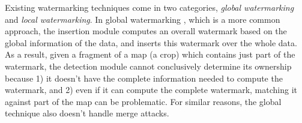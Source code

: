 

Existing watermarking techniques come in two categories, 
{\em global watermarking} and {\em local watermarking}. 
In global watermarking
\cite{KhannaZ00, SionAP02, SionAP03, Kitamura01:DFT, Liyuanyuan03},
which is a more common approach,
the insertion module computes an overall watermark based on 
the global information of the data, 
and inserts this watermark over the whole data. As a result,
given a fragment of a map  (a crop) which contains just part of 
the watermark, the detection module cannot conclusively determine 
its ownership because 1) it doesn't
have the complete information needed to compute the watermark, and 2)
even if it can compute the complete watermark, matching it against part of
the map can be problematic. For similar reasons,
the global technique also doesn't handle merge attacks.

